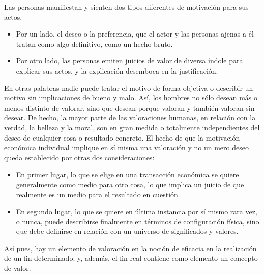 Las personas manifiestan y sienten dos tipos diferentes de motivación para sus actos, 
\begin{itemize}
    \item Por un lado, el deseo o la preferencia, que el actor y las personas ajenas a él tratan como algo definitivo, como un hecho bruto.
    \item Por otro lado, las personas emiten juicios de valor de diversa índole para explicar sus actos, y la explicación desemboca en la justificación.
\end{itemize}
En otras palabras nadie puede tratar el motivo de forma objetiva o describir un motivo sin implicaciones de bueno y malo. Así, los hombres no sólo desean más o menos distinto de valorar, sino que desean porque valoran y también valoran sin desear. De hecho, la mayor parte de las valoraciones humanas, en relación con la verdad, la belleza y la moral, son en gran medida o totalmente independientes del deseo de cualquier cosa o resultado concreto. El hecho de que la motivación económica individual implique en sí misma una valoración y no un mero deseo queda establecido por otras dos consideraciones:
\begin{itemize}
    \item En primer lugar, lo que se elige en una transacción económica se quiere generalmente como medio para otro cosa, lo que implica un juicio de que realmente es un medio para el resultado en cuestión. 
    \item En segundo lugar, lo que se quiere en última instancia por sí mismo rara vez, o nunca, puede describirse finalmente en términos de configuración física, sino que debe definirse en relación con un universo de significados y valores. 
\end{itemize}
Así pues, hay un elemento de valoración en la noción de eficacia en la realización de un fin determinado; y, además, el fin real contiene como elemento un concepto de valor.\\

